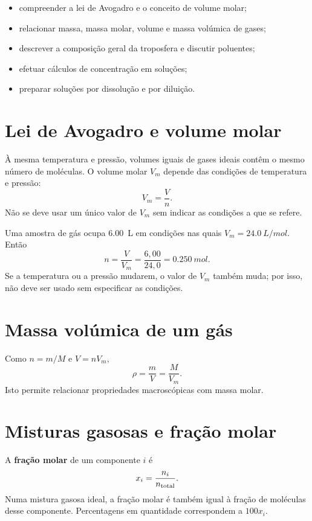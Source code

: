 \documentclass[11pt,a4paper,oneside]{book}
\begin{document}
\begin{objetivos}
\begin{itemize}
  \item compreender a lei de Avogadro e o conceito de volume molar;
  \item relacionar massa, massa molar, volume e massa volúmica de gases;
  \item descrever a composição geral da troposfera e discutir poluentes;
  \item efetuar cálculos de concentração em soluções;
  \item preparar soluções por dissolução e por diluição.
\end{itemize}
\end{objetivos}

\section{Lei de Avogadro e volume molar}
À mesma temperatura e pressão, volumes iguais de gases ideais contêm o mesmo número de moléculas. O volume molar $V_m$ depende das condições de temperatura e pressão:
\[
V_m=\frac{V}{n}.
\]
Não se deve usar um único valor de $V_m$ sem indicar as condições a que se refere.

\begin{exemplo}[title=Exemplo resolvido -- volume molar]
Uma amostra de gás ocupa \SI{6.00}{L} em condições nas quais $V_m=\SI{24.0}{L/mol}$. Então
\[
n=\frac{V}{V_m}=\frac{6{,}00}{24{,}0}=\SI{0.250}{mol}.
\]
Se a temperatura ou a pressão mudarem, o valor de $V_m$ também muda; por isso, não deve ser usado sem especificar as condições.
\end{exemplo}

\section{Massa volúmica de um gás}
Como $n=m/M$ e $V=nV_m$,
\[
\rho=\frac{m}{V}=\frac{M}{V_m}.
\]
Isto permite relacionar propriedades macroscópicas com massa molar.

\section{Misturas gasosas e fração molar}
A \textbf{fração molar} de um componente $i$ é
\[
x_i=\frac{n_i}{n_{\rm total}}.
\]
Numa mistura gasosa ideal, a fração molar é também igual à fração de moléculas desse componente. Percentagens em quantidade correspondem a $100x_i$.
\end{document}
